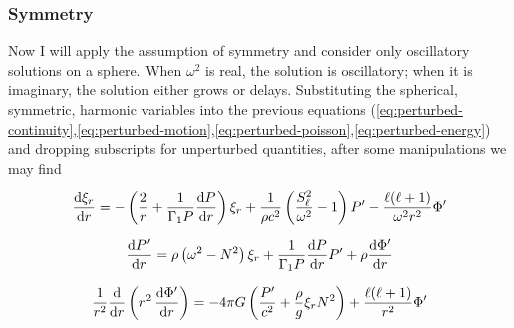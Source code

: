 \subsubsection*{Symmetry}
Now I will apply the assumption of symmetry and consider only oscillatory solutions on a sphere. 
When $\omega^2$ is real, the solution is oscillatory; when it is imaginary, the solution either grows or delays. 
Substituting the spherical, symmetric, harmonic variables into the previous equations (\ref{eq:perturbed-continuity},\ref{eq:perturbed-motion},\ref{eq:perturbed-poisson},\ref{eq:perturbed-energy}) and dropping subscripts for unperturbed quantities, after some manipulations we may find 
\begin{gather} \label{eq:oscillation1}
    \frac{\text{d}\xi_r}{\text{d}r}
    =
    -\left(
        \frac{2}{r}
        +
        \frac{1}{\Gamma_1 P}
        \frac{\text{d}P}{\text{d}r}
    \right)
    \xi_r
    +
    \frac{1}{\rho c^2}
    \left(
        \frac{S_\ell^2}{\omega^2}
        -
        1
    \right)
    P'
    -
    \frac{\ell(\ell+1)}{\omega^2 r^2}
    \Phi' \vphantom{\Bigg(}
    \\
    \frac{\text{d}P'}{\text{d}r}
    =
    \rho \left(
        \omega^2 - N^2
    \right) 
    \xi_r
    +
    \frac{1}{\Gamma_1 P}
    \frac{\text{d}P}{\text{d}r}
    P'
    +
    \rho \frac{\text{d} \Phi'}{\text{d} r}
    \vphantom{\Bigg(}
    \\
    \frac{1}{r^2}
    \frac{\text{d}}{\text{d}r}
    \left(
        r^2\,
        \frac{\text{d}\Phi'}{\text{d}r}
    \right)
    =
    -4\pi G \left(
        \frac{P'}{c^2}
        +
        \frac{\rho}{g}
        \xi_r
        N^2
    \right)
    +
    \frac{\ell(\ell+1)}{r^2}
    \Phi' \vphantom{\Bigg(}
    \label{eq:oscillation3}
\end{gather}%
